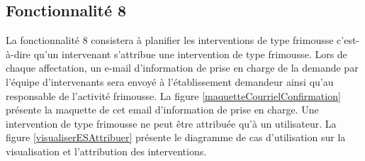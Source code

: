 
\subsection{Fonctionnalité 8}

La fonctionnalité 8 consistera à planifier les interventions de type frimousse c'est-à-dire qu'un intervenant s'attribue une intervention de type frimousse.
Lors de chaque affectation, un e-mail d'information de prise en charge de la demande par l'équipe d'intervenants sera envoyé à l'établissement demandeur ainsi qu'au responsable de l'activité frimousse.
La figure \ref{maquetteCourrielConfirmation} présente la maquette de cet email d'information de prise en charge. 
Une intervention de type frimousse ne peut être attribuée qu'à un utilisateur.
  La figure \ref{visualiserESAttribuer} présente le diagramme de cas d'utilisation sur la visualisation et l'attribution des interventions.\\
